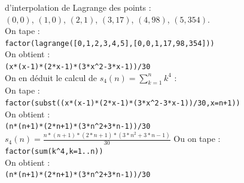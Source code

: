 \documentclass[a4paper,11pt]{book}
\begin{document}
d'interpolation de Lagrange des points :\\
$(0,0)$, $(1,0)$, $(2,1)$, $(3,17)$, $(4,98)$, $(5,354)$.\\
On tape :\\
{\tt factor(lagrange([0,1,2,3,4,5],[0,0,1,17,98,354]))}\\
On obtient :\\
{\tt (x*(x-1)*(2*x-1)*(3*x\verb|^|2-3*x-1))/30}\\
On en d\'eduit le calcul de $s_4(n)=\sum_{k=1}^nk^4$ :\\
On tape :\\
{\tt factor(subst((x*(x-1)*(2*x-1)*(3*x\verb|^|2-3*x-1))/30,x=n+1))}\\
On obtient :\\
{\tt (n*(n+1)*(2*n+1)*(3*n\verb|^|2+3*n-1))/30}\\
$s_4(n)=\frac{n*(n+1)*(2*n+1)*(3*n^2+3*n-1)}{30}$
Ou on tape :\\
{\tt factor(sum(k\verb|^|4,k=1..n))}\\
On obtient :\\
{\tt (n*(n+1)*(2*n+1)*(3*n\verb|^|2+3*n-1))/30}
\end{document}
